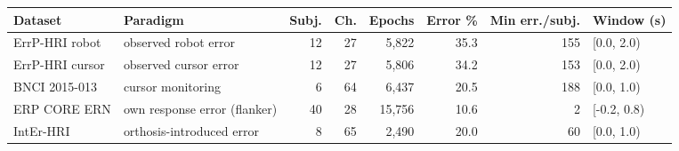 \begin{tabular}{llrrrrrl}
\toprule
Dataset & Paradigm & Subj. & Ch. & Epochs & Error \% & Min err./subj. & Window (s) \\
\midrule
ErrP-HRI robot & observed robot error & 12 & 27 & 5,822 & 35.3 & 155 & [0.0, 2.0) \\
ErrP-HRI cursor & observed cursor error & 12 & 27 & 5,806 & 34.2 & 153 & [0.0, 2.0) \\
BNCI 2015-013 & cursor monitoring & 6 & 64 & 6,437 & 20.5 & 188 & [0.0, 1.0) \\
ERP CORE ERN & own response error (flanker) & 40 & 28 & 15,756 & 10.6 & 2 & [-0.2, 0.8) \\
IntEr-HRI & orthosis-introduced error & 8 & 65 & 2,490 & 20.0 & 60 & [0.0, 1.0) \\
\bottomrule
\end{tabular}
